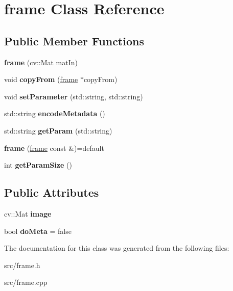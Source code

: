 \hypertarget{classframe}{}\section{frame Class Reference}
\label{classframe}
\subsection*{Public Member Functions}
\begin{DoxyCompactItemize}
\item 
{\bfseries frame} (cv\+::\+Mat mat\+In)\hypertarget{classframe_a30973e896689cd48838800f2ffba8b73}{}\label{classframe_a30973e896689cd48838800f2ffba8b73}

\item 
void {\bfseries copy\+From} (\hyperlink{classframe}{frame} $\ast$copy\+From)\hypertarget{classframe_a7f497befd5e8e84ad7e3f67e7b1ce0d5}{}\label{classframe_a7f497befd5e8e84ad7e3f67e7b1ce0d5}

\item 
void {\bfseries set\+Parameter} (std\+::string, std\+::string)\hypertarget{classframe_a5da1dc6366e266943d87c050f84b1422}{}\label{classframe_a5da1dc6366e266943d87c050f84b1422}

\item 
std\+::string {\bfseries encode\+Metadata} ()\hypertarget{classframe_abfce006d754b16c702a001f2efd27b1e}{}\label{classframe_abfce006d754b16c702a001f2efd27b1e}

\item 
std\+::string {\bfseries get\+Param} (std\+::string)\hypertarget{classframe_af9c18f99fb0ec5174a320c7bd2601b83}{}\label{classframe_af9c18f99fb0ec5174a320c7bd2601b83}

\item 
{\bfseries frame} (\hyperlink{classframe}{frame} const \&)=default\hypertarget{classframe_ab47afb1047012eee24fa2e175c52cde1}{}\label{classframe_ab47afb1047012eee24fa2e175c52cde1}

\item 
int {\bfseries get\+Param\+Size} ()\hypertarget{classframe_aea4d8c6ae44c207aa6e7130c2abe8e85}{}\label{classframe_aea4d8c6ae44c207aa6e7130c2abe8e85}

\end{DoxyCompactItemize}
\subsection*{Public Attributes}
\begin{DoxyCompactItemize}
\item 
cv\+::\+Mat {\bfseries image}\hypertarget{classframe_a718c495452424ccef0090ef136702f02}{}\label{classframe_a718c495452424ccef0090ef136702f02}

\item 
bool {\bfseries do\+Meta} = false\hypertarget{classframe_ad7e4a6ba334e987c71f908a2fbbff76c}{}\label{classframe_ad7e4a6ba334e987c71f908a2fbbff76c}

\end{DoxyCompactItemize}


The documentation for this class was generated from the following files\+:\begin{DoxyCompactItemize}
\item 
src/frame.\+h\item 
src/frame.\+cpp\end{DoxyCompactItemize}

